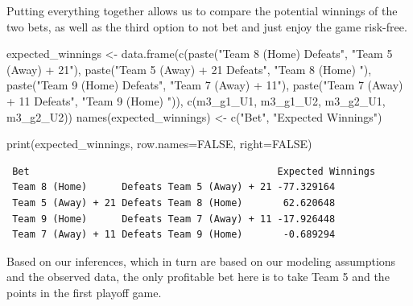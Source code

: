 \documentclass[
  letterpaper,
  DIV=11,
  numbers=noendperiod]{scrartcl}
\newenvironment{Shaded}{\begin{snugshade}}{\end{snugshade}}
\newcommand{\AttributeTok}[1]{\textcolor[rgb]{0.40,0.45,0.13}{#1}}
\newcommand{\ConstantTok}[1]{\textcolor[rgb]{0.56,0.35,0.01}{#1}}
\newcommand{\FunctionTok}[1]{\textcolor[rgb]{0.28,0.35,0.67}{#1}}
\newcommand{\NormalTok}[1]{\textcolor[rgb]{0.00,0.23,0.31}{#1}}
\newcommand{\OtherTok}[1]{\textcolor[rgb]{0.00,0.23,0.31}{#1}}
\newcommand{\StringTok}[1]{\textcolor[rgb]{0.13,0.47,0.30}{#1}}
\begin{document}
Putting everything together allows us to compare the potential winnings
of the two bets, as well as the third option to not bet and just enjoy
the game risk-free.

\begin{Shaded}
\begin{Highlighting}[]
\NormalTok{expected\_winnings }\OtherTok{\textless{}{-}} \FunctionTok{data.frame}\NormalTok{(}\FunctionTok{c}\NormalTok{(}\FunctionTok{paste}\NormalTok{(}\StringTok{"Team 8 (Home)      Defeats"}\NormalTok{,}
                                        \StringTok{"Team 5 (Away) + 21"}\NormalTok{),}
                                  \FunctionTok{paste}\NormalTok{(}\StringTok{"Team 5 (Away) + 21 Defeats"}\NormalTok{,}
                                        \StringTok{"Team 8 (Home)    "}\NormalTok{),}
                                  \FunctionTok{paste}\NormalTok{(}\StringTok{"Team 9 (Home)      Defeats"}\NormalTok{,}
                                        \StringTok{"Team 7 (Away) + 11"}\NormalTok{),}
                                  \FunctionTok{paste}\NormalTok{(}\StringTok{"Team 7 (Away) + 11 Defeats"}\NormalTok{,}
                                        \StringTok{"Team 9 (Home)    "}\NormalTok{)),}
                                \FunctionTok{c}\NormalTok{(m3\_g1\_U1, m3\_g1\_U2,}
\NormalTok{                                  m3\_g2\_U1, m3\_g2\_U2))}
\FunctionTok{names}\NormalTok{(expected\_winnings) }\OtherTok{\textless{}{-}} \FunctionTok{c}\NormalTok{(}\StringTok{"Bet"}\NormalTok{, }\StringTok{"Expected Winnings"}\NormalTok{)}

\FunctionTok{print}\NormalTok{(expected\_winnings, }\AttributeTok{row.names=}\ConstantTok{FALSE}\NormalTok{, }\AttributeTok{right=}\ConstantTok{FALSE}\NormalTok{)}
\end{Highlighting}
\end{Shaded}

\begin{verbatim}
 Bet                                           Expected Winnings
 Team 8 (Home)      Defeats Team 5 (Away) + 21 -77.329164       
 Team 5 (Away) + 21 Defeats Team 8 (Home)       62.620648       
 Team 9 (Home)      Defeats Team 7 (Away) + 11 -17.926448       
 Team 7 (Away) + 11 Defeats Team 9 (Home)       -0.689294       
\end{verbatim}

Based on our inferences, which in turn are based on our modeling
assumptions and the observed data, the only profitable bet here is to
take Team 5 and the points in the first playoff game.
\end{document}
